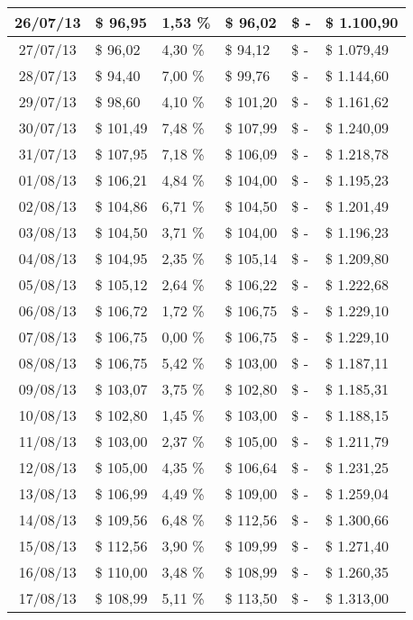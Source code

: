 \begin{small}
\begin{longtable}{|c|l|l|l|l|l|}
26/07/13 & \$ 96,95 & 1,53 \% & \$ 96,02 & \$ - & \$ 1.100,90 \\ \hline
27/07/13 & \$ 96,02 & 4,30 \% & \$ 94,12 & \$ - & \$ 1.079,49 \\ \hline
28/07/13 & \$ 94,40 & 7,00 \% & \$ 99,76 & \$ - & \$ 1.144,60 \\ \hline
29/07/13 & \$ 98,60 & 4,10 \% & \$ 101,20 & \$ - & \$ 1.161,62 \\ \hline
30/07/13 & \$ 101,49 & 7,48 \% & \$ 107,99 & \$ - & \$ 1.240,09 \\ \hline
31/07/13 & \$ 107,95 & 7,18 \% & \$ 106,09 & \$ - & \$ 1.218,78 \\ \hline
01/08/13 & \$ 106,21 & 4,84 \% & \$ 104,00 & \$ - & \$ 1.195,23 \\ \hline
02/08/13 & \$ 104,86 & 6,71 \% & \$ 104,50 & \$ - & \$ 1.201,49 \\ \hline
03/08/13 & \$ 104,50 & 3,71 \% & \$ 104,00 & \$ - & \$ 1.196,23 \\ \hline
04/08/13 & \$ 104,95 & 2,35 \% & \$ 105,14 & \$ - & \$ 1.209,80 \\ \hline
05/08/13 & \$ 105,12 & 2,64 \% & \$ 106,22 & \$ - & \$ 1.222,68 \\ \hline
06/08/13 & \$ 106,72 & 1,72 \% & \$ 106,75 & \$ - & \$ 1.229,10 \\ \hline
07/08/13 & \$ 106,75 & 0,00 \% & \$ 106,75 & \$ - & \$ 1.229,10 \\ \hline
08/08/13 & \$ 106,75 & 5,42 \% & \$ 103,00 & \$ - & \$ 1.187,11 \\ \hline
09/08/13 & \$ 103,07 & 3,75 \% & \$ 102,80 & \$ - & \$ 1.185,31 \\ \hline
10/08/13 & \$ 102,80 & 1,45 \% & \$ 103,00 & \$ - & \$ 1.188,15 \\ \hline
11/08/13 & \$ 103,00 & 2,37 \% & \$ 105,00 & \$ - & \$ 1.211,79 \\ \hline
12/08/13 & \$ 105,00 & 4,35 \% & \$ 106,64 & \$ - & \$ 1.231,25 \\ \hline
13/08/13 & \$ 106,99 & 4,49 \% & \$ 109,00 & \$ - & \$ 1.259,04 \\ \hline
14/08/13 & \$ 109,56 & 6,48 \% & \$ 112,56 & \$ - & \$ 1.300,66 \\ \hline
15/08/13 & \$ 112,56 & 3,90 \% & \$ 109,99 & \$ - & \$ 1.271,40 \\ \hline
16/08/13 & \$ 110,00 & 3,48 \% & \$ 108,99 & \$ - & \$ 1.260,35 \\ \hline
17/08/13 & \$ 108,99 & 5,11 \% & \$ 113,50 & \$ - & \$ 1.313,00 \\ \hline

\end{longtable}
\end{small}
